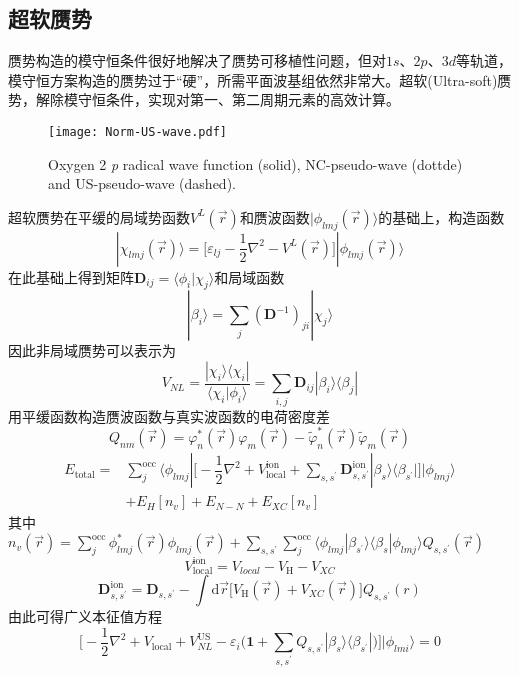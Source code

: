 \subsection{超软赝势}
赝势构造的模守恒条件很好地解决了赝势可移植性问题，但对$1s$、$2p$、$3d$等轨道，模守恒方案构造的赝势过于“硬”，所需平面波基组依然非常大。超软\textrm{(Ultra-soft)}赝势，解除模守恒条件，实现对第一、第二周期元素的高效计算。
\begin{figure}[h!]
\centering
\texttt{[image: Norm-US-wave.pdf]}
\caption{\small \textrm{Oxygen 2} \textit{p} \textrm{radical wave function (solid), NC-pseudo-wave (dottde) and US-pseudo-wave (dashed).}}%
\label{Norm-US-wave}
\end{figure}
超软赝势在平缓的局域势函数$V^L(\vec r)$和赝波函数$|\phi_{lmj}(\vec r)\rangle$的基础上，构造函数
\begin{equation}
	|\chi_{lmj}(\vec r)\rangle=\bigg[\varepsilon_{lj}-\dfrac12\nabla^2-V^L(\vec r)\bigg]|\phi_{lmj}(\vec r)\rangle
  \label{eq:uspp_1}
\end{equation}
在此基础上得到矩阵$\mathbf{D}_{ij}=\langle\phi_i|\chi_j\rangle$和局域函数
\begin{equation}
	|\beta_i\rangle=\sum_j(\mathbf{D}^{-1})_{ji}|\chi_{j}\rangle
  \label{eq:uspp_2}
\end{equation}
因此非局域赝势可以表示为
\begin{equation}
	V_{NL}=\dfrac{|\chi_i\rangle\langle\chi_i|}{\langle\chi_i|\phi_i\rangle}=\sum_{i,j}\mathbf{D}_{ij}|\beta_i\rangle\langle\beta_j|
  \label{eq:uspp_3}
\end{equation}
用平缓函数构造赝波函数与真实波函数的电荷密度差
\begin{equation}
	Q_{nm}(\vec r)=\varphi_n^{\ast}(\vec r)\varphi_m(\vec r)-\tilde\varphi_n^{\ast}(\vec r)\tilde\varphi_m(\vec r)
  \label{eq:uspp_4}
\end{equation}
	\begin{equation}
		\begin{aligned}
			E_{\mathrm{total}}=&\sum_j^{\mathrm{occ}}\langle\phi_{lmj}|\bigg[-\dfrac12\nabla^2+V_{\mathrm{local}}^{\mathrm{ion}}+\sum_{s,s^{\prime}}\mathbf{D}_{s,s^{\prime}}^{\mathrm{ion}}|\beta_s\rangle\langle\beta_{s^{\prime}}|\bigg]|\phi_{lmj}\rangle\\
			&+E_{H}[n_v]+E_{N-N}+E_{XC}[n_v]
		\end{aligned}
  \label{eq:uspp_5}
	\end{equation}
其中$n_v(\vec r)=\sum\limits_j^{\mathrm{occ}}\phi_{lmj}^{\ast}(\vec r)\phi_{lmj}(\vec r)+\sum\limits_{s,s^{\prime}}\sum\limits_j^{\mathrm{occ}}\langle\phi_{lmj}|\beta_{s^{\prime}}\rangle\langle\beta_s|\phi_{lmj}\rangle Q_{s,s^{\prime}}(\vec r)$
	$$V_{\mathrm{local}}^{\mathrm{ion}}=V_{local}-V_{\mathrm H}-V_{XC}$$
	$$\mathbf{D}_{s,s^{\prime}}^{\mathrm{ion}}=\mathbf{D}_{s,s^{\prime}}-\int\mathrm{d}\vec r\big[V_{\mathrm{H}}(\vec r)+V_{XC}(\vec r)\big]Q_{s,s^{\prime}}(r)$$
由此可得广义本征值方程
	$$\bigg[-\dfrac12\nabla^2+V_{\mathrm{local}}+V_{NL}^{\mathrm{US}}-\varepsilon_i\bigg(\mathbf{1}+\sum_{s,s^{\prime}}Q_{s,s^{\prime}}|\beta_s\rangle\langle\beta_{s^{\prime}}|\bigg)\bigg]|\phi_{lmi}\rangle=0$$

